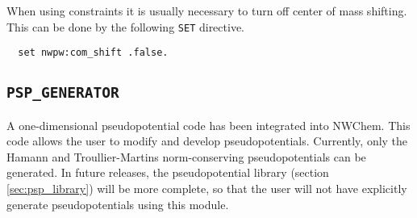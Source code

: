 When using constraints it is usually necessary to turn off
center of mass shifting. This can be done by the following \verb+SET+ directive.
\begin{verbatim}
  set nwpw:com_shift .false.
\end{verbatim}



\subsection{\tt PSP\_GENERATOR}
\label{sec:pspw_psp_generator}
A one-dimensional pseudopotential code has been integrated into NWChem.
This code allows the user to modify and develop pseudopotentials.  Currently, 
only the Hamann and Troullier-Martins norm-conserving pseudopotentials can be
generated.  In future releases, the pseudopotential library (section \ref{sec:psp_library})
will be more complete, so that the user will not have explicitly generate
pseudopotentials using this module.

